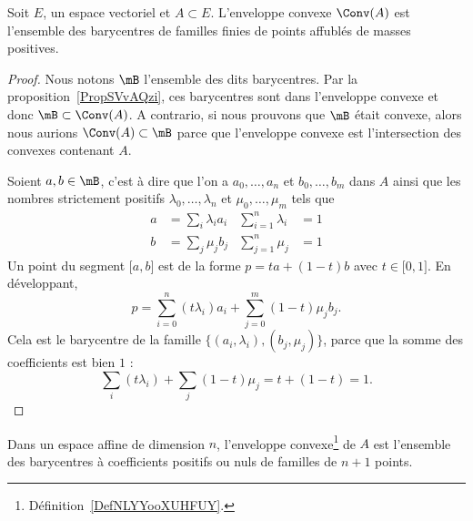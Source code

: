 \begin{proposition} \label{PropYHMTmZX}
    Soit \( E\), un espace vectoriel et \( A\subset E\). L'enveloppe convexe \( \Conv(A)\) est l'ensemble des barycentres de familles finies de points affublés de masses positives.
\end{proposition}

\begin{proof}
    Nous notons \( \mB\) l'ensemble des dits barycentres. Par la proposition~\ref{PropSVvAQzi}, ces barycentres sont dans l'enveloppe convexe et donc \( \mB\subset\Conv(A)\). A contrario, si nous prouvons que \( \mB\) était convexe, alors nous aurions \( \Conv(A)\subset\mB\) parce que l'enveloppe convexe est l'intersection des convexes contenant $A$.

    Soient \( a,b\in\mB\), c'est à dire que l'on a \( a_0,\ldots, a_n\) et \( b_0,\ldots, b_m\) dans \( A\) ainsi que les nombres strictement positifs \( \lambda_0,\ldots, \lambda_n\) et \( \mu_0,\ldots, \mu_m\) tels que
    \begin{subequations}
        \begin{align}
            a&=\sum_i\lambda_ia_i       & \sum_{i=1}^n\lambda_i&=1\\
            b&=\sum_j\mu_jb_j           &\sum_{j=1}^n\mu_j&=1
        \end{align}
    \end{subequations}
    Un point du segment \( \mathopen[ a , b \mathclose]\) est de la forme \( p=ta+(1-t)b\) avec \( t\in \mathopen[ 0 , 1 \mathclose]\). En développant,
    \begin{equation}
        p=\sum_{i=0}^n(t\lambda_i)a_i+\sum_{j=0}^m(1-t)\mu_jb_j.
    \end{equation}
    Cela est le barycentre de la famille \( \{ (a_i,\lambda_i),(b_j,\mu_j) \}\), parce que la somme des coefficients est bien \( 1\) :
    \begin{equation}
        \sum_i(t\lambda_i)+\sum_j(1-t)\mu_j=t+(1-t)=1.
    \end{equation}
\end{proof}


\begin{theorem} \label{ThoJLDjXLe}
    Dans un espace affine de dimension \( n\), l'enveloppe convexe\footnote{Définition~\ref{DefNLYYooXUHFUY}.} de \( A\) est l'ensemble des barycentres à coefficients positifs ou nuls de familles de \( n+1\) points.
\end{theorem}


